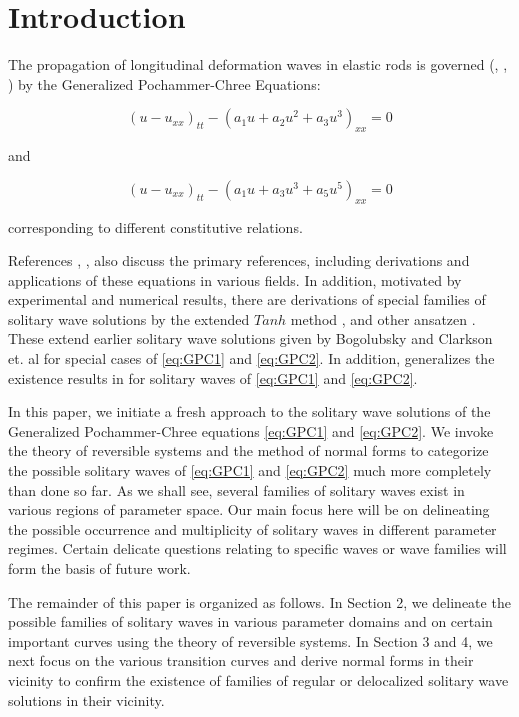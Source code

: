 \section{Introduction}

The propagation of longitudinal deformation waves in elastic rods is governed
(\cite{LCZ}, \cite{Runz}, \cite{WM}) by the Generalized Pochammer-Chree
Equations:

\begin{equation}\label{eq:GPC1}
\left( u - u_{xx} \right)_{tt} - \left( a_1 u + a_2 u^2 + a_3 u^3 \right)_{xx} =0  
\end{equation}

and

\begin{equation}  \label{eq:GPC2} 
\left( u - u_{xx} \right)_{tt} - \left( a_1 u + a_3 u^3 + a_5 u^5 \right)_{xx} =0
\end{equation}

corresponding to different constitutive relations.

References \cite{LCZ}, \cite{Runz}, \cite{WM} also discuss the primary
references, including derivations and applications of these equations in
various fields. In addition, motivated by experimental and numerical results,
there are derivations of special families of solitary wave solutions by the
extended $Tanh$ method \cite{LCZ}, and other ansatzen \cite{WM}. These extend
earlier solitary wave solutions given by Bogolubsky \cite{Bogo} and Clarkson
et. al \cite{CLVS} for special cases of \eqref{eq:GPC1} and \eqref{eq:GPC2}. In
addition, \cite{Runz} generalizes the existence results in \cite{Sax} for
solitary waves of \eqref{eq:GPC1} and \eqref{eq:GPC2}.  

In this paper, we initiate a fresh approach to the solitary wave solutions of
the Generalized Pochammer-Chree equations \eqref{eq:GPC1} and \eqref{eq:GPC2}.
We invoke the theory of reversible systems and the method of normal forms to
categorize the possible solitary waves of \eqref{eq:GPC1} and \eqref{eq:GPC2}
much more completely than done so far.  As we shall see, several families of
solitary waves exist in various regions of parameter space. Our main focus here
will be on delineating the possible occurrence and multiplicity of solitary
waves in different parameter regimes. Certain delicate questions relating to
specific waves or wave families will form the basis of future work. 

The remainder of this paper is organized as follows. In Section 2, we delineate
the possible families of solitary waves in various parameter domains and on
certain important curves using the theory of reversible systems. In Section 3
and 4, we next focus on the various transition curves and derive normal forms
in their vicinity to confirm the existence of families of regular or
delocalized solitary wave solutions in their vicinity.
